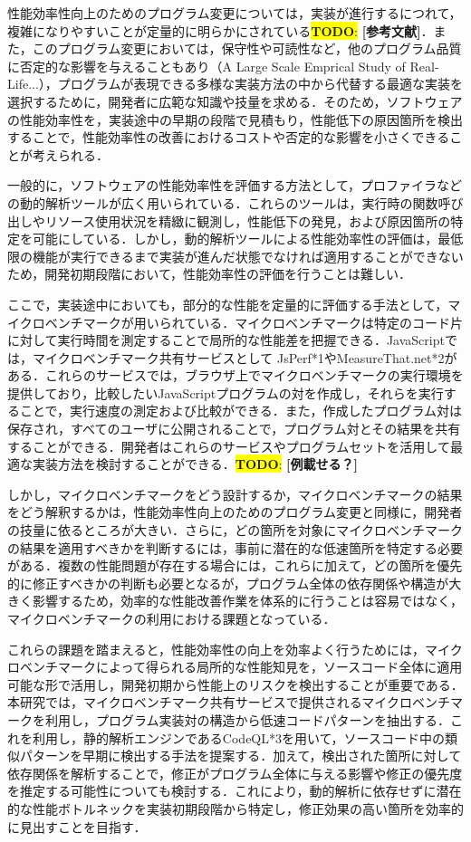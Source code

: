 \documentclass[submit,techrep,noauthor]{ipsj}
\newcommand{\todo}[1]{\colorbox{yellow}{{\bf TODO}:}{\color{red} {\textbf{[#1]}}}}
\begin{document}
性能効率性向上のためのプログラム変更については，実装が進行するにつれて，複雑になりやすいことが定量的に明らかにされている\todo{参考文献}．また，このプログラム変更においては，保守性や可読性など，他のプログラム品質に否定的な影響を与えることもあり（A Large Scale Emprical Study of Real-Life...），プログラムが表現できる多様な実装方法の中から代替する最適な実装を選択するために，開発者に広範な知識や技量を求める．そのため，ソフトウェアの性能効率性を，実装途中の早期の段階で見積もり，性能低下の原因箇所を検出することで，性能効率性の改善におけるコストや否定的な影響を小さくできることが考えられる． 

一般的に，ソフトウェアの性能効率性を評価する方法として，プロファイラなどの動的解析ツールが広く用いられている．これらのツールは，実行時の関数呼び出しやリソース使用状況を精緻に観測し，性能低下の発見，および原因箇所の特定を可能にしている．しかし，動的解析ツールによる性能効率性の評価は，最低限の機能が実行できるまで実装が進んだ状態でなければ適用することができないため，開発初期段階において，性能効率性の評価を行うことは難しい．

ここで，実装途中においても，部分的な性能を定量的に評価する手法として，マイクロベンチマークが用いられている．マイクロベンチマークは特定のコード片に対して実行時間を測定することで局所的な性能差を把握できる．JavaScriptでは，マイクロベンチマーク共有サービスとして JsPerf*1やMeasureThat.net*2がある．これらのサービスでは，ブラウザ上でマイクロベンチマークの実行環境を提供しており，比較したいJavaScriptプログラムの対を作成し，それらを実行することで，実行速度の測定および比較ができる．また，作成したプログラム対は保存され，すべてのユーザに公開されることで，プログラム対とその結果を共有することができる．開発者はこれらのサービスやプログラムセットを活用して最適な実装方法を検討することができる．\todo{例載せる？}

しかし，マイクロベンチマークをどう設計するか，マイクロベンチマークの結果をどう解釈するかは，性能効率性向上のためのプログラム変更と同様に，開発者の技量に依るところが大きい．さらに，どの箇所を対象にマイクロベンチマークの結果を適用すべきかを判断するには，事前に潜在的な低速箇所を特定する必要がある．複数の性能問題が存在する場合には，これらに加えて，どの箇所を優先的に修正すべきかの判断も必要となるが，プログラム全体の依存関係や構造が大きく影響するため，効率的な性能改善作業を体系的に行うことは容易ではなく，マイクロベンチマークの利用における課題となっている．

これらの課題を踏まえると，性能効率性の向上を効率よく行うためには，マイクロベンチマークによって得られる局所的な性能知見を，ソースコード全体に適用可能な形で活用し，開発初期から性能上のリスクを検出することが重要である．本研究では，マイクロベンチマーク共有サービスで提供されるマイクロベンチマークを利用し，プログラム実装対の構造から低速コードパターンを抽出する．これを利用し，静的解析エンジンであるCodeQL*3を用いて，ソースコード中の類似パターンを早期に検出する手法を提案する．加えて，検出された箇所に対して依存関係を解析することで，修正がプログラム全体に与える影響や修正の優先度を推定する可能性についても検討する．これにより，動的解析に依存せずに潜在的な性能ボトルネックを実装初期段階から特定し，修正効果の高い箇所を効率的に見出すことを目指す．
\end{document}
